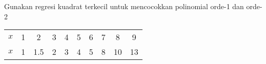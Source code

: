 \begin{soal}
Gunakan regresi kuadrat terkecil untuk mencocokkan polinomial
orde-1 dan orde-2

{\centering
\begin{tabular}{|c|ccccccccc|}
\hline
$x$ & 1 & 2 & 3 & 4 & 5 & 6 & 7 & 8 & 9 \\
$x$ & 1 & 1.5 & 2 & 3 & 4 & 5 & 8 & 10 & 13 \\
\hline
\end{tabular}
\par}
\end{soal}
